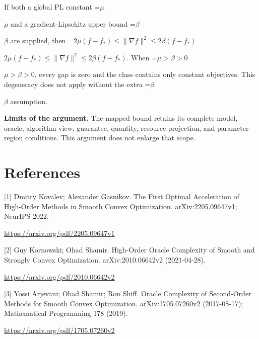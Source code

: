 \documentclass[10pt,a4paper]{article}
\newcommand{\AtlasMath}[1]{\par\begingroup\centering\setbox0=\hbox{$\displaystyle #1$}\ifdim\wd0>1.4\linewidth\typeout{ATLAS WIDE FORMULA: \the\wd0}\fi\ifdim\wd0>\linewidth\resizebox{\linewidth}{!}{\box0}\else\box0\fi\par\endgroup}
\newcommand{\AtlasInlineMath}[1]{\begingroup\setbox0=\hbox{$#1$}\ifdim\wd0>.4\linewidth\endgroup\AtlasMath{#1}\else\endgroup$#1$\fi}
\begin{document}
If both a global PL constant \AtlasInlineMath{\mu} and a gradient-Lipschitz upper bound \AtlasInlineMath{\beta} are supplied, then \AtlasInlineMath{2\mu(f-f_*)\le\|\nabla f\|^2\le2\beta(f-f_*)}. When \AtlasInlineMath{\mu>\beta>0}, every gap is zero and the class contains only constant objectives. This degeneracy does not apply without the extra \AtlasInlineMath{\beta} assumption.

\textbf{Limits of the argument.} The mapped bound retains its complete model, oracle, algorithm view, guarantee, quantity, resource projection, and parameter-region conditions. This argument does not enlarge that scope.

\section{References}
[1] Dmitry Kovalev; Alexander Gasnikov. The First Optimal Acceleration of High-Order Methods in Smooth Convex Optimization. arXiv:2205.09647v1; NeurIPS 2022.

\url{https://arxiv.org/pdf/2205.09647v1}

[2] Guy Kornowski; Ohad Shamir. High-Order Oracle Complexity of Smooth and Strongly Convex Optimization. arXiv:2010.06642v2 (2021-04-28).

\url{https://arxiv.org/pdf/2010.06642v2}

[3] Yossi Arjevani; Ohad Shamir; Ron Shiff. Oracle Complexity of Second-Order Methods for Smooth Convex Optimization. arXiv:1705.07260v2 (2017-08-17); Mathematical Programming 178 (2019).

\url{https://arxiv.org/pdf/1705.07260v2}
\end{document}
